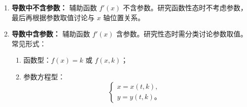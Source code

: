 \begin{enumerate}
    \item \textbf{导数中不含参数：}
          辅助函数 $f'(x)$ 不含参数。研究函数性态时不考虑参数，最后再根据参数取值讨论与 $x$ 轴位置关系。
    \item \textbf{导数中含参数：}
          辅助函数 $f'(x)$ 含参数。研究性态时需分类讨论参数取值。常见形式：
          \begin{enumerate}
              \item 函数型：$f(x)=k$ 或 $f(x,k)$；
              \item 参数方程型：
                    \[
                        \begin{cases}
                            x = x(t,k), \\
                            y = y(t,k)。
                        \end{cases}
                    \]
          \end{enumerate}
\end{enumerate}